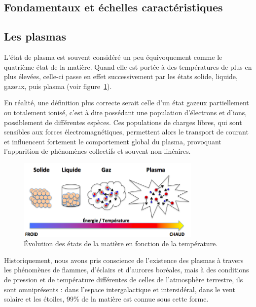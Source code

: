 \label{Introduction}
\begin{refsection}

\section{Fondamentaux et échelles caractéristiques}
\subsection{Les plasmas}
L'état de plasma est souvent considéré un peu équivoquement comme
le quatrième état de la matière. Quand elle est portée à des températures
de plus en plus élevées, celle-ci passe en effet successivement par les états
solide, liquide, gazeux, puis plasma (voir figure~\ref{1-plasma}).

En réalité,
une définition plus correcte serait celle d'un état gazeux partiellement ou totalement ionisé, c'est à dire possédant une population d'électrons et d'ions,
possiblement de différentes espèces. Ces populations de charges libres, qui
sont sensibles aux forces électromagnétiques, permettent alors le transport de
courant et influencent fortement le comportement global du plasma, provoquant
l'apparition de phénomènes collectifs et souvent non-linéaires.

\begin{figure}[htbp]
\centering
\includegraphics[width=0.8\textwidth]{figures/1-plasma.png}{\caption{Évolution
des états de la matière en fonction de la température.}\label{1-plasma}}
\end{figure}

Historiquement, nous avons pris conscience de l'existence des plasmas à travers
les phénomènes de flammes, d'éclairs et d'aurores boréales, mais à des
conditions de pression et de température différentes de celles de l'atmosphère
terrestre, ils sont omniprésents : dans l'espace intergalactique et
intersidéral, dans le vent solaire et les étoiles, 99\% de la matière est connue
sous cette forme.


\end{refsection}
